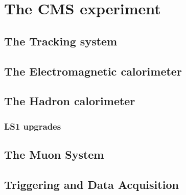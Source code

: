 \chapter{The CMS experiment}

\section{The Tracking system}

\section{The Electromagnetic calorimeter}

\section{The Hadron calorimeter}

\subsection{LS1 upgrades}

\section{The Muon System}

\section{Triggering and Data Acquisition}
    



